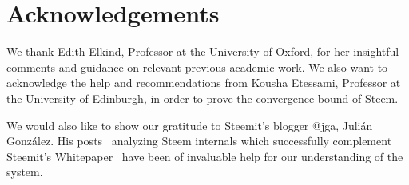 \section{Acknowledgements}
  We thank Edith Elkind, Professor at the University of Oxford, for her insightful comments and guidance on relevant previous academic work. 
  We also want to acknowledge the help and recommendations from Kousha Etessami, Professor at the University of Edinburgh, in order to prove the convergence bound of Steem.

  We would also like to show our gratitude to Steemit's blogger @jga, Juli\'an Gonz\'alez. His posts~\cite{curationRewards,selfvoters} analyzing Steem internals which successfully complement Steemit's Whitepaper~\cite{steemit} have been of invaluable help for our understanding of the system. 
